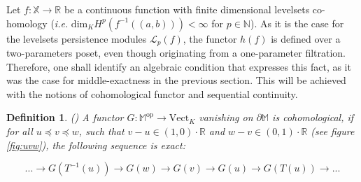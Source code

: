 \documentclass[11pt]{article}
\newtheorem{definition}[theorem]{Definition}
\theoremstyle{remark}
\newcommand{\N}{\mathbb{N}}
\newcommand{\R}{\mathbb{R}}
\newcommand{\X}{\mathbb{X}}
\newcommand{\M}{\mathbb{M}}
\begin{document}
Let $f:\X\rightarrow\R$ be a continuous function with finite dimensional levelsets co-homology (\textit{i.e.} $\mathrm{dim}_K H^p(f^{-1}((a,b)))<\infty$ for $p\in\N$). As it is the case for the levelsets persistence modules $\mathcal{L}_p(f)$, the functor $h(f)$ is defined over a two-parameters poset, even though originating from a one-parameter filtration. Therefore, one shall identify an algebraic condition that expresses this fact, as it was the case for middle-exactness in the previous section. This will be achieved with the notions of cohomological functor and sequential continuity. 

\begin{definition}(\autocite[Definition~C.1]{bauer2021structure})
A functor $G : \M^{\mathrm{op}} \longrightarrow \mathrm{Vect}_K$ vanishing on $\partial \M$ is cohomological, if for all $u \preceq v \preceq w$, such that $v-u \in (1,0) \cdot \R$ and $w - v \in (0,1) \cdot \R$ (see figure \ref{fig:uvw}), the following sequence is exact:

\[ ... \longrightarrow G(T^{-1}(u)) \longrightarrow G(w) \longrightarrow G(v) \longrightarrow G(u) \longrightarrow G(T(u)) \longrightarrow ... \]

\end{definition}
\end{document}
